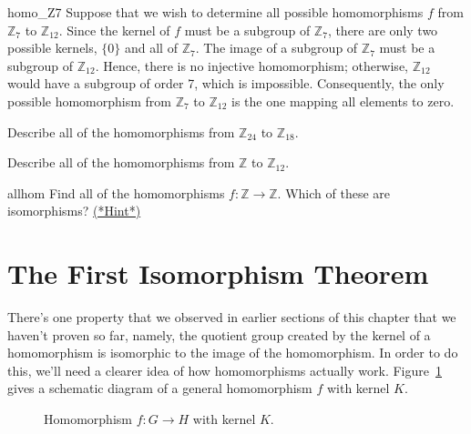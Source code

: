 \begin{example}{homo_Z7}
Suppose that we wish to determine all possible homomorphisms $f$
from ${\mathbb Z}_7$ to  ${\mathbb Z}_{12}$. Since the kernel of $f$ must
be a subgroup of  ${\mathbb Z}_7$, there are only two possible
kernels, $\{ 0 \}$ and all of ${\mathbb Z}_7$.  The image of a subgroup
of ${\mathbb Z}_7$ must be a subgroup of ${\mathbb Z}_{12}$. Hence, there is
no injective homomorphism; otherwise, ${\mathbb Z}_{12}$ would have a
subgroup of order 7, which is impossible. Consequently, the only
possible homomorphism from ${\mathbb Z}_7$ to  ${\mathbb Z}_{12}$ is the one
mapping all elements to zero. 
\end{example}

\begin{exercise}{}
Describe all of the homomorphisms from ${\mathbb Z}_{24}$ to ${\mathbb
Z}_{18}$. 
\end{exercise} 
 
\begin{exercise}{}
Describe all of the homomorphisms from ${\mathbb Z}$ to ${\mathbb Z}_{12}$. 
\end{exercise} 

\begin{exercise}{allhom}
Find all of the homomorphisms $f : {\mathbb Z} \rightarrow {\mathbb Z}$.
Which of these are isomorphisms?
\hyperref[sec:homomorph:hints]{(*Hint*)} 
\end{exercise} 

 
\section{The First Isomorphism Theorem}
\label{sec:Homomorphism:FirstIsomorphismTheorem}
 
There's one property that we observed in earlier sections of this chapter that we haven't proven so far, namely,  the quotient group created by the kernel of a homomorphism is isomorphic to the image of the homomorphism.  In order to do this, we'll need a clearer idea of how homomorphisms actually work. Figure~\ref{fig:homomorph3} gives a schematic diagram of a general homomorphism $f$ with kernel $K$. 
\begin{figure}[htb]
	  \caption{\label{fig:homomorph3} Homomorphism $f:G \rightarrow H$ with kernel $K$. }
\end{figure}


